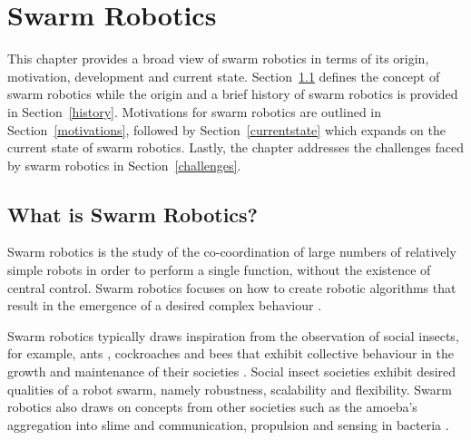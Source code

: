
\chapter{Swarm Robotics}
\label{chap:first}


This chapter provides a broad view of swarm robotics in terms of its origin, motivation, development and current state.
Section~\ref{sec:first:definitionswarmrobotics} defines the concept of swarm robotics while the origin and a brief history of swarm robotics is provided in Section~\ref{history}. Motivations for swarm robotics are outlined in Section~\ref{motivations}, followed by Section~\ref{currentstate} which expands on the current state of swarm robotics. Lastly, the chapter addresses the challenges faced by swarm robotics in Section~\ref{challenges}.


\section{What is Swarm Robotics?}
\label{sec:first:definitionswarmrobotics}

Swarm robotics is the study of the co-coordination of large numbers of relatively simple robots in order to perform a single function, without the existence of central control. Swarm robotics focuses on how to create robotic algorithms that result in the emergence of a desired complex behaviour \cite{csahin2005swarm}.

Swarm robotics typically draws inspiration from the observation of social insects, for example, ants \cite{hoff2010two}, cockroaches \cite{garnier2005aggregation} and bees \cite{lee2012foraging} that exhibit collective behaviour in the growth and maintenance of their societies \cite{wilson1971insect}. Social insect societies exhibit desired qualities of a robot swarm, namely robustness, scalability and flexibility. Swarm robotics also draws on concepts from other societies such as the amoeba's aggregation into slime \cite{schmickl2007navigation} and communication, propulsion and sensing in bacteria \cite{dhariwal2004bacterium,martel2010using}. 

